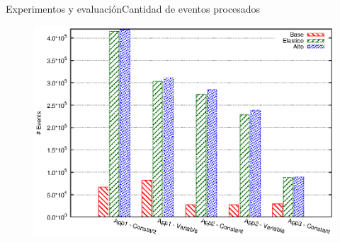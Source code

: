 
\begin{frame}{Experimentos y evaluación}{Cantidad de eventos procesados}

\begin{figure}[p]
	\centering
	\includegraphics[scale=0.7]{images/exp/eventTotal.eps}
\end{figure}
\end{frame}